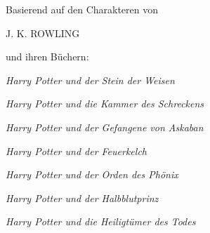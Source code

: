 \cleartoverso
\thispagestyle{empty}
\begin{center}
\vspace*{2.0cm}
Basierend auf den Charakteren von
\vspace*{0.5cm}\par
\Large J. K. ROWLING\normalsize\par
\vspace*{0.5cm}
und ihren Büchern:\par
\vspace*{0.5cm}
\def \hpOrigSeriesBook #1{
	\textit{Harry Potter und #1}\smallskip\par
}
\hpOrigSeriesBook{der Stein der Weisen}
\hpOrigSeriesBook{die Kammer des Schreckens}
\hpOrigSeriesBook{der Gefangene von Askaban}
\hpOrigSeriesBook{der Feuerkelch}
\hpOrigSeriesBook{der Orden des Phönix}
\hpOrigSeriesBook{der Halbblutprinz}
\hpOrigSeriesBook{die Heiligtümer des Todes}
\end{center}
\clearpage
